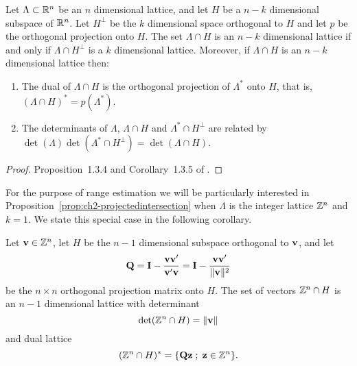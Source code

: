 \begin{proposition} \label{prop:ch2-projectedintersection}
Let $\Lambda\subset{\mathbb R}^n$ be an $n$ dimensional lattice, and let $H$ be a $n-k$ dimensional subspace of ${\mathbb R}^n$.  Let $H^\perp$ be the $k$ dimensional space orthogonal to $H$ and let $p$ be the orthogonal projection onto $H$.  The set $\Lambda \cap H$ is an $n-k$ dimensional lattice if and only if $\Lambda \cap H^\perp$ is a $k$ dimensional lattice.  Moreover, if $\Lambda \cap H$ is an $n-k$ dimensional lattice then:
\begin{enumerate}
\item The dual of $\Lambda \cap H$ is the orthogonal projection of $\Lambda^*$ onto $H$, that is, $(\Lambda \cap H)^* = p(\Lambda^*)$.
\item The determinants of $\Lambda$, $\Lambda \cap H$ and $\Lambda^* \cap H^{\perp}$ are related by $\det(\Lambda) \det(\Lambda^* \cap H^{\perp}) = \operatorname{det}(\Lambda \cap H)$.
\end{enumerate}
\end{proposition}
\begin{proof}
Proposition~1.3.4 and Corollary~1.3.5 of \cite{Martinet2003}.
\end{proof}

For the purpose of range estimation we will be particularly interested in Proposition~\ref{prop:ch2-projectedintersection} when $\Lambda$ is the integer lattice ${\mathbb Z}^n$ and $k = 1$.  We state this special case in the following corollary.

\begin{corollary} \label{cor:intlatticedim1}
Let $\mathbf{v}\in{\mathbb Z}^n$, let $H$ be the $n-1$ dimensional subspace orthogonal to $\mathbf{v}$, and let
\[
\mathbf{Q} = \mathbf{I} - \frac{\mathbf{v}\mathbf{v}^\prime}{\mathbf{v}^\prime\mathbf{v}} = \mathbf{I} - \frac{\mathbf{v}\mathbf{v}^\prime}{\|\mathbf{v}\|^2}
\]
be the $n\times n$ orthogonal projection matrix onto $H$.  The set of vectors ${\mathbb Z}^n\cap H$ is an $n-1$ dimensional lattice with determinant 
\[
\det({\mathbb Z}^n \cap H) = \|\mathbf{v}\|
\]
and dual lattice
\[
({\mathbb Z}^n \cap H)^* = \{ \mathbf{Q} \mathbf{z} \; ; \; \mathbf{z} \in {\mathbb Z}^n \}.
\]
\end{corollary}


